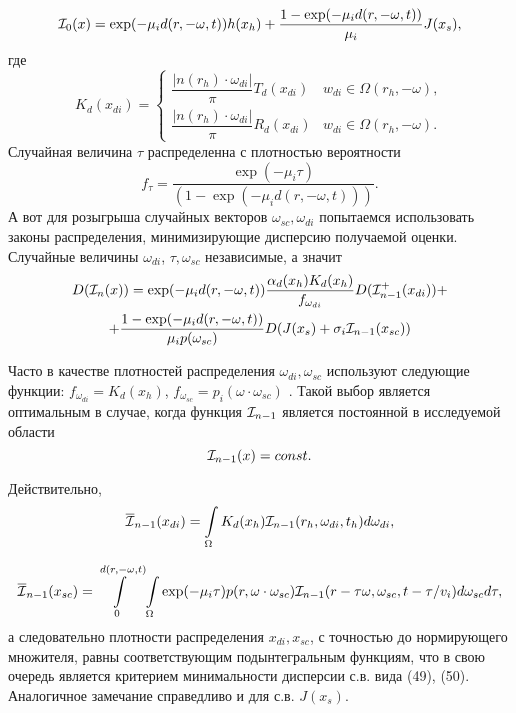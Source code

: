 \documentclass[12pt,reqno]{report}
\begin{document}
\begin{equation}
{\cal I}_0(x) = \exp(-\mu_i d(r, -\omega, t)) h(x_h) +
\frac{1 - \exp(-\mu_i d(r, -\omega, t))}{\mu_i} J(x_s),
\end{equation}
где
$$
K_d(x_{di}) = \left \{ 
\begin{array}{ll} 
	\dfrac{|n(r_h)\cdot \omega_{di}|}{\pi} T_d(x_{di}) & w_{di} \in \Omega(r_h,-\omega), \\
	\dfrac{|n(r_h)\cdot \omega_{di}|}{\pi} R_d(x_{di}) & w_{di} \in \Omega(r_h,-\omega).
\end{array} \right.
$$
Случайная величина $\tau$ распределенна с плотностью вероятности
$$
f_\tau = \displaystyle{\frac{\exp(-\mu_i \tau)}{(1-\exp(-\mu_i d(r,
-\omega, t)))}}.
$$
А вот для розыгрыша случайных векторов $\omega_{sc}, \omega_{di}$ 
попытаемся использовать законы распределения, 
минимизирующие дисперсию получаемой оценки.
Случайные величины  $\omega_{di}$, $\tau, \omega_{sc}$ независимые, а значит
\begin{multline}
D({\cal I}_n(x)) = \exp(-\mu_i d(r, -\omega, t)) \frac{\alpha_d(x_h) K_d(x_h)} {f_{\omega_{di}}} D({\cal I}_{n-1}^+ (x_{di})) + \\
 + \frac{1 - \exp(-\mu_i d(r, -\omega, t))}{\mu_i p(\omega_{sc})} D(J(x_{s}) + \sigma_i {\cal I}_{n-1}(x_{sc}))
\end{multline}

Часто в качестве плотностей распределения $\omega_{di}, \omega_{sc}$ используют следующие функции: 
${\displaystyle f_{\omega_{di}} = K_d(x_h)}$, 
${\displaystyle f_{\omega_{sc}} = p_i(\omega \cdot \omega_{sc}) }$ \cite{33}.
Такой выбор является оптимальным в случае, 
когда функция ${\cal I}_{n-1}$ является постоянной в исследуемой области
\begin{equation}
{\cal I}_{n-1}(x) = const.
\end{equation}

Действительно,
\begin{equation}
{\overline{\cal I}_{n-1}(x_{di})} = 
\int\limits_{\Omega} K_d(x_h) {\cal I}_{n-1}(r_h, \omega_{di}, t_h)d\omega_{di},
\end{equation}

\begin{equation}
{\overline{\cal I}_{n-1}(x_{sc})} = 
\int \limits^{d(r,-\omega,t)}_0 \int\limits_{\Omega} \exp(- \mu_i \tau) 
p(r,\omega \cdot\omega_{sc}) {\cal I}_{n-1}(r-\tau\omega,\omega_{sc},t-\tau/v_i)d\omega_{sc}d\tau ,
\end{equation}
а следовательно плотности распределения $x_{di}, x_{sc}$, с точностью до нормирующего множителя, равны 
соответствующим подынтегральным функциям,
что в свою очередь является критерием минимальности дисперсии с.в. вида (49), (50).
Аналогичное замечание справедливо и для с.в. $J(x_s)$.
\end{document}
